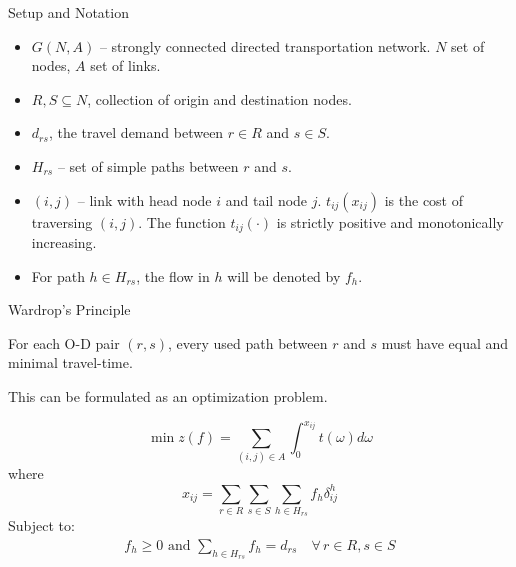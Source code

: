 \documentclass{beamer}
\begin{document}
\begin{frame}{Setup and Notation}
\begin{itemize}
    \item $G(N,A)$ -- strongly connected directed transportation network.
    $N$ set of nodes, $A$ set of links.

    \item $R, S\subseteq N$, collection of origin and destination nodes.

    \item $d_{rs}$, the travel demand between $r\in R$ and $s\in S$.

    \item $H_{rs}$ -- set of simple paths between $r$ and $s$.

    \item $(i,j)$ -- link with head node $i$ and tail node $j$.
    $t_{ij}(x_{ij})$ is the cost of traversing $(i,j)$. The
    function $t_{ij}(\cdot)$ is strictly positive and monotonically
    increasing.

    \item For path $h\in H_{rs}$, the flow in $h$ will be
    denoted by $f_h$.
\end{itemize}
\end{frame}

\begin{frame}{Wardrop's Principle}
\begin{definition}[UE-Condition]
    For each O-D pair $(r,s)$, every used path between $r$ and
    $s$ must have equal and minimal travel-time.
\end{definition}

This can be formulated as an optimization problem.

\[
    \min z(f) = \sum_{(i,j)\in A} \int_0^{
    x_{ij}
    } t(\omega)d\omega
\]
where
\[
    x_{ij} = \sum_{r\in R}\sum_{s\in S}\sum_{h\in H_{rs}}f_h
    \delta_{ij}^h
\]
Subject to:
\[
\begin{split}
    f_h\geq 0 \text{ and }\sum_{h\in H_{rs}} f_h = d_{rs}\quad \forall\, r\in R,s\in S
\end{split}
\]
\end{frame}
\end{document}
